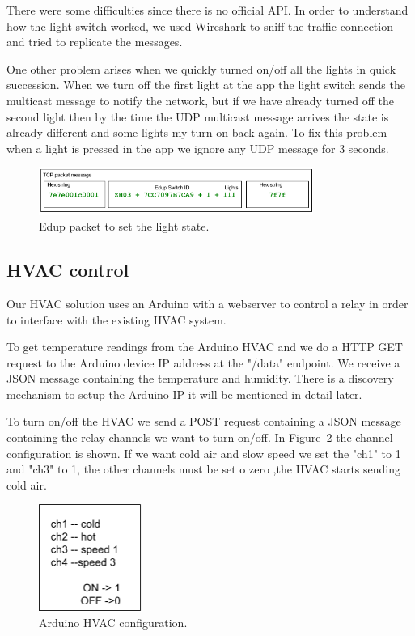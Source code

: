 There were some difficulties since there is no official API. In order to understand how the light switch worked, we used Wireshark to sniff the traffic connection and tried to replicate the messages.

One other problem arises when we quickly turned on/off all the lights in quick succession. When we turn off the first light at the app the light switch sends the multicast message to notify the network, but if we have already turned off the second light then by the time the \ac{UDP} multicast message arrives the state is already different and some lights my turn on back again. To fix this problem when a light is pressed in the app we ignore any \ac{UDP} message for 3 seconds.


\begin{figure}[h]
\centering
\includegraphics[width=0.8\textwidth]{Figures/Edup_imp}
\caption{Edup packet to set the light state.}
\label{edup_imp}
\end{figure}



\subsection{HVAC control}

Our HVAC solution uses an Arduino with a webserver to control a relay in order to interface with the existing HVAC system.

To get temperature readings from the Arduino \ac{HVAC} and we do a \ac{HTTP}  GET request to the Arduino device \ac{IP} address at the "/data" endpoint. We receive a \ac{JSON} message containing the temperature and humidity. There is a discovery mechanism to setup the Arduino IP it will be mentioned in detail later.

To turn on/off the \ac{HVAC} we send a POST request containing a \ac{JSON} message containing the relay channels we want to turn on/off. In Figure~\ref{arduino_post_imp} the channel configuration is shown. If we want cold air   and slow speed we set the "ch1" to 1 and "ch3" to 1, the other channels must be set o zero ,the \ac{HVAC} starts sending cold air.


\begin{figure}[h]
\centering
\includegraphics[width=0.3\textwidth]{Figures/temperature_post_imp}
\caption{Arduino HVAC configuration.}
\label{arduino_post_imp}
\end{figure}




